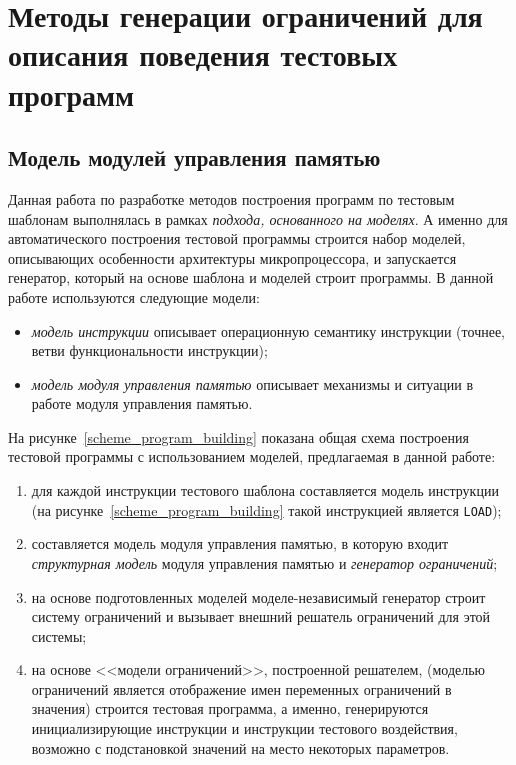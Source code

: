 \chapter{Методы генерации ограничений для описания поведения тестовых программ}

\section{Модель модулей управления памятью}

Данная работа по разработке методов построения программ по тестовым
шаблонам выполнялась в рамках \emph{подхода, основанного на
моделях}. А именно для автоматического построения тестовой программы
строится набор моделей, описывающих особенности архитектуры
микропроцессора, и запускается генератор, который на основе шаблона
и моделей строит программы. В данной работе используются следующие
модели:
\begin{itemize}
  \item \emph{модель инструкции} описывает операционную семантику
  инструкции (точнее, ветви функциональности инструкции);
  \item \emph{модель модуля управления памятью} описывает механизмы
  и ситуации в работе модуля управления памятью.
\end{itemize}

На рисунке~\ref{scheme_program_building} показана общая схема
построения тестовой программы с использованием моделей, предлагаемая
в данной работе:
\begin{enumerate}
    \item для каждой инструкции тестового шаблона составляется
    модель инструкции (на рисунке~\ref{scheme_program_building}
    такой инструкцией является \texttt{LOAD});
    \item составляется модель модуля управления памятью, в которую
    входит \emph{структурная модель} модуля управления памятью и
    \emph{генератор ограничений};
    \item на основе подготовленных моделей моделе-независимый
    генератор строит систему ограничений и вызывает внешний решатель
    ограничений для этой системы;
    \item на основе <<модели ограничений>>, построенной решателем,
    (моделью ограничений является отображение имен переменных
    ограничений в значения) строится тестовая программа, а именно,
    генерируются инициализирующие инструкции и инструкции тестового воздействия, возможно с
    подстановкой значений на место некоторых параметров.
\end{enumerate}

